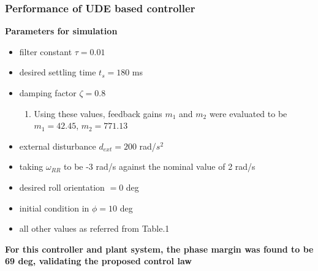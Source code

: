\documentclass[table,10pt,red]{beamer}	%
\begin{document}
\begin{frame}
\frametitle{Performance of UDE based controller}
\textbf{Parameters for simulation}
\begin{itemize}  %
		\item filter constant $\tau=0.01$
		\item desired settling time $t_s= 180$ ms
		\item damping factor $\zeta = 0.8$
				\begin{enumerate}
					\item Using these values, feedback gains $m_1$ and $m_2$ were evaluated to be $m_1=42.45$, $m_2=771.13$ 
				\end{enumerate}
		\item external disturbance $d_{ext}= 200$ rad/$s^2$
		\item taking $\omega_{RR}$ to be -3 rad/s against the nominal value of 2 rad/s
		\item desired roll orientation $=0$ deg
		\item initial condition in $\phi= 10$ deg
		\item all other values as referred from Table.1
	\end{itemize}
	
\textbf{For this controller and plant system, the phase margin was found to be 69 deg, validating the proposed control law}
\end{frame}
\end{document}
